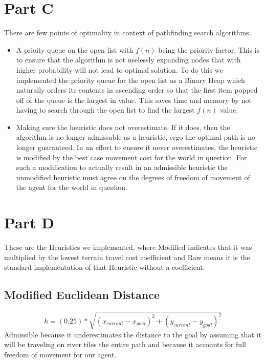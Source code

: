 \documentclass[12pt]{article}
\begin{document}
\section{Part C}
There are few points of optimality in context of pathfinding search algorithms.
\begin{itemize}
  \item A prioity queue on the open list with \(f(n)\) being the priority factor. This is to ensure that the algorithm is not uselessly expanding nodes that with higher probability will not lead to optimal solution. To do this we implemented the priority queue for the open list as a Binary Heap which naturally orders its contents in ascending order so that the first item popped off of the queue is the largest in value. This saves time and memory by not having to search through the open list to find the largest \(f(n)\) value.
  \item Making sure the heuristic does not overestimate. If it does, then the algorithm is no longer admissable as a heuristic, ergo the optimal path is no longer guaranteed. In an effort to ensure it never overestimates, the heuristic is modified by the best case movement cost for the world in question. For such a modification to actually result in an admissible heuristic the unmodified heuristic must agree on the degrees of freedom of movement of the agent for the world in question. 
\end{itemize}


\section{Part D}
These are the Heuristics we implemented, where Modified indicates that it was multiplied by the lowest terrain travel cost coefficient and Raw means it is the standard implementation of that Heuristic without a coefficient.
\subsection{Modified Euclidean Distance}
 \[ h = (0.25) * \sqrt{ (x_{current} - x_{goal})^2 + (y_{current} - y_{goal})^2}\]
\newline
 Admissible because it underestimates the distance to the goal by assuming that it will be traveling on river tiles the entire path and because it accounts for full freedom of movement for our agent.
\end{document}

